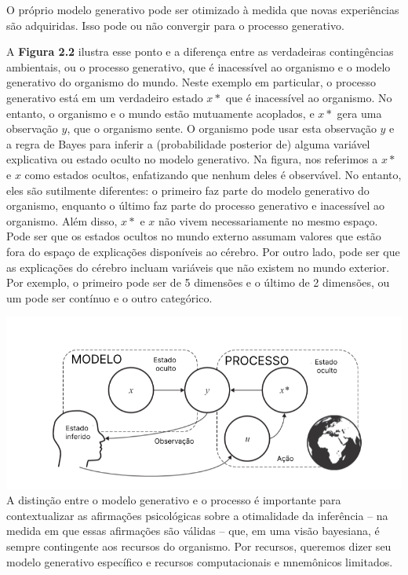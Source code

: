 \documentclass[
  12pt,
]{book}
\begin{document}
O próprio modelo generativo pode ser otimizado à medida que novas experiências são adquiridas. Isso pode ou não convergir para o processo generativo.

A \textbf{Figura 2.2} ilustra esse ponto e a diferença entre as verdadeiras contingências ambientais, ou o processo generativo, que é inacessível ao organismo e o modelo generativo do organismo do mundo. Neste exemplo em particular, o processo generativo está em um verdadeiro estado \(x*\) que é inacessível ao organismo. No entanto, o organismo e o mundo estão mutuamente acoplados, e \(x*\) gera uma observação \(y\), que o organismo sente. O organismo pode usar esta observação \(y\) e a regra de Bayes para inferir a (probabilidade posterior de) alguma variável explicativa ou estado oculto no modelo generativo. Na figura, nos referimos a \(x*\) e \(x\) como estados ocultos, enfatizando que nenhum deles é observável. No entanto, eles são sutilmente diferentes: o primeiro faz parte do modelo generativo do organismo, enquanto o último faz parte do processo generativo e inacessível ao organismo. Além disso, \(x*\) e \(x\) não vivem necessariamente no mesmo espaço. Pode ser que os estados ocultos no mundo externo assumam valores que estão fora do espaço de explicações disponíveis ao cérebro. Por outro lado, pode ser que as explicações do cérebro incluam variáveis que não existem no mundo exterior. Por exemplo, o primeiro pode ser de 5 dimensões e o último de 2 dimensões, ou um pode ser contínuo e o outro categórico.

\includegraphics{images/Figura2_2.png}
A distinção entre o modelo generativo e o processo é importante para contextualizar as afirmações psicológicas sobre a otimalidade da inferência -- na medida em que essas afirmações são válidas -- que, em uma visão bayesiana, é sempre contingente aos recursos do organismo. Por recursos, queremos dizer seu modelo generativo específico e recursos computacionais e mnemônicos limitados.
\end{document}
